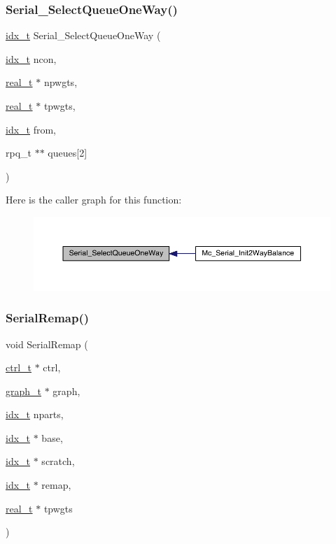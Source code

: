 \subsubsection{\texorpdfstring{Serial\+\_\+\+Select\+Queue\+One\+Way()}{Serial\_SelectQueueOneWay()}}
{\footnotesize\ttfamily \hyperlink{a00876_aaa5262be3e700770163401acb0150f52}{idx\+\_\+t} Serial\+\_\+\+Select\+Queue\+One\+Way (\begin{DoxyParamCaption}\item[{\hyperlink{a00876_aaa5262be3e700770163401acb0150f52}{idx\+\_\+t}}]{ncon,  }\item[{\hyperlink{a00876_a1924a4f6907cc3833213aba1f07fcbe9}{real\+\_\+t} $\ast$}]{npwgts,  }\item[{\hyperlink{a00876_a1924a4f6907cc3833213aba1f07fcbe9}{real\+\_\+t} $\ast$}]{tpwgts,  }\item[{\hyperlink{a00876_aaa5262be3e700770163401acb0150f52}{idx\+\_\+t}}]{from,  }\item[{rpq\+\_\+t $\ast$$\ast$}]{queues\mbox{[}2\mbox{]} }\end{DoxyParamCaption})}

Here is the caller graph for this function\+:\nopagebreak
\begin{figure}[H]
\begin{center}
\leavevmode
\includegraphics[width=350pt]{a00407_a9f0787bb9b0a641e0f5cdcbb6152ff1f_icgraph}
\end{center}
\end{figure}
\mbox{\label{a00407_aa139665d0b90ebdcfc8e227a983994b2}} 
\subsubsection{\texorpdfstring{Serial\+Remap()}{SerialRemap()}}
{\footnotesize\ttfamily void Serial\+Remap (\begin{DoxyParamCaption}\item[{\hyperlink{a00742}{ctrl\+\_\+t} $\ast$}]{ctrl,  }\item[{\hyperlink{a00734}{graph\+\_\+t} $\ast$}]{graph,  }\item[{\hyperlink{a00876_aaa5262be3e700770163401acb0150f52}{idx\+\_\+t}}]{nparts,  }\item[{\hyperlink{a00876_aaa5262be3e700770163401acb0150f52}{idx\+\_\+t} $\ast$}]{base,  }\item[{\hyperlink{a00876_aaa5262be3e700770163401acb0150f52}{idx\+\_\+t} $\ast$}]{scratch,  }\item[{\hyperlink{a00876_aaa5262be3e700770163401acb0150f52}{idx\+\_\+t} $\ast$}]{remap,  }\item[{\hyperlink{a00876_a1924a4f6907cc3833213aba1f07fcbe9}{real\+\_\+t} $\ast$}]{tpwgts }\end{DoxyParamCaption})}

